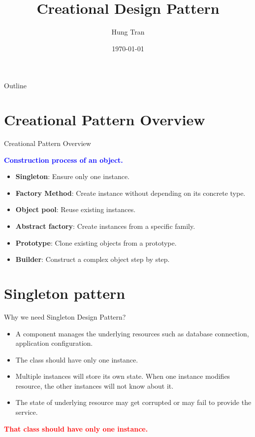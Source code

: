 \documentclass[13pt]{beamer}
\title[Design Pattern]{Creational Design Pattern}
\author{Hung Tran}
\institute{Fpt software}
\date{\today}
\begin{document}
\begin{frame}
  \titlepage
\end{frame}

\begin{frame}{Outline}
  \tableofcontents
\end{frame}

\section{Creational Pattern Overview}

\begin{frame}{Creational Pattern Overview}
	\begin{center}
	\textcolor{blue}{\textbf{Construction process of an object.}}
	\end{center}
	\begin{itemize}
		\setlength\itemsep{1em}
		\item \textbf{Singleton}: Ensure only one instance.
		\item \textbf{Factory Method}: Create instance without depending on its concrete type.
		\item \textbf{Object pool}: Reuse existing instances.
		\item \textbf{Abstract factory}: Create instances from a specific family.
		\item \textbf{Prototype}: Clone existing objects from a prototype.
		\item \textbf{Builder}: Construct a complex object step by step.
	\end{itemize}
\end{frame}

\section{Singleton pattern}

\begin{frame}{Why we need Singleton Design Pattern?}
	\begin{itemize}
		\setlength\itemsep{1em}
		\item A component manages the underlying resources such as database connection, application configuration.
		\item The class should have only one instance.
		\item Multiple instances will store its own state. When one instance modifies resource, the other instances will not know about it. 
		\item The state of underlying resource may get corrupted or may fail to provide the service.
	\end{itemize}
	\begin{center}
	\textcolor{red}{\textbf{That class should have only one instance.}}
	\end{center}
\end{frame}
\end{document}
